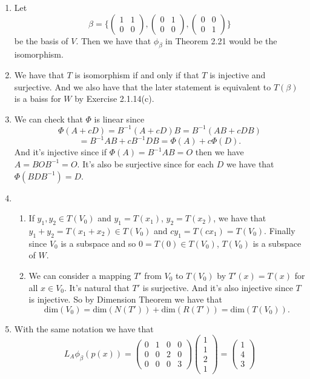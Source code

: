 \begin{enumerate}
\item Let 
\[\beta =\{\left(\begin{array}{cc}1&1\\0&0\end{array}\right),\left(\begin{array}{cc}0&1\\0&0\end{array}\right),\left(\begin{array}{cc}0&0\\0&1\end{array}\right)\}\] be the basis of $V$. Then we have that $\phi_{\beta}$ in Theorem 2.21 would be the isomorphism.
\item We have that $T$ is isomorphism if and only if that $T$ is injective and surjective. And we also have that the later statement is equivalent to $T(\beta )$ is a baiss for $W$ by Exercise 2.1.14(c).
\item We can check that $\Phi$ is linear since 
\[\Phi(A+cD)=B^{-1}(A+cD)B=B^{-1}(AB+cDB)\]
\[=B^{-1}AB+cB^{-1}DB=\Phi(A)+c\Phi(D).\]
And it's injective since if $\Phi(A)=B^{-1}AB=O$ then we have $A=BOB^{-1}=O$. It's also be surjective since for each $D$ we have that $\Phi(BDB^{-1})=D$.
\item \begin{enumerate}
\item If $y_1,y_2\in T(V_0)$ and $y_1=T(x_1)$, $y_2=T(x_2)$, we have that $y_1+y_2=T(x_1+x_2)\in T(V_0)$ and $cy_1=T(cx_1)=T(V_0)$. Finally since $V_0$ is a subspace and so $0=T(0)\in T(V_0)$, $T(V_0)$ is a subspace of $W$.
\item We can consider a mapping $T'$ from $V_0$ to $T(V_0)$ by $T'(x)=T(x)$ for all $x\in V_0$. It's natural that $T'$ is surjective. And it's also injective since $T$ is injective. So by Dimension Theorem we have that 
\[\mathrm{dim}(V_0)=\mathrm{dim}(N(T'))+\mathrm{dim}(R(T'))=\mathrm{dim}(T(V_0)).\]
\end{enumerate}
\item With the same notation we have that 
\[L_A\phi_{\beta}(p(x))=\left(\begin{array}{cccc}0&1&0&0\\0&0&2&0\\0&0&0&3\end{array}\right)\left(\begin{array}{c}1\\1\\2\\1\end{array}\right)=\left(\begin{array}{c}1\\4\\3\end{array}\right)\]

\end{enumerate}
